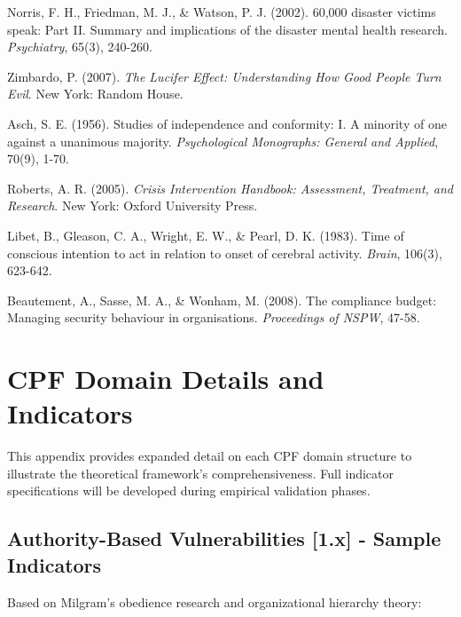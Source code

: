\documentclass[11pt,a4paper]{article}
\begin{document}
\begin{thebibliography}{99}
 Norris, F. H., Friedman, M. J., \& Watson, P. J. (2002). 60,000 disaster victims speak: Part II. Summary and implications of the disaster mental health research. \textit{Psychiatry}, 65(3), 240-260.

 Zimbardo, P. (2007). \textit{The Lucifer Effect: Understanding How Good People Turn Evil}. New York: Random House.

 Asch, S. E. (1956). Studies of independence and conformity: I. A minority of one against a unanimous majority. \textit{Psychological Monographs: General and Applied}, 70(9), 1-70.

 Roberts, A. R. (2005). \textit{Crisis Intervention Handbook: Assessment, Treatment, and Research}. New York: Oxford University Press.

 Libet, B., Gleason, C. A., Wright, E. W., \& Pearl, D. K. (1983). Time of conscious intention to act in relation to onset of cerebral activity. \textit{Brain}, 106(3), 623-642.

 Beautement, A., Sasse, M. A., \& Wonham, M. (2008). The compliance budget: Managing security behaviour in organisations. \textit{Proceedings of NSPW}, 47-58.

\end{thebibliography}

\appendix

\section{CPF Domain Details and Indicators}

This appendix provides expanded detail on each CPF domain structure to illustrate the theoretical framework's comprehensiveness. Full indicator specifications will be developed during empirical validation phases.

\subsection{Authority-Based Vulnerabilities [1.x] - Sample Indicators}

Based on Milgram's obedience research and organizational hierarchy theory:
\end{document}
